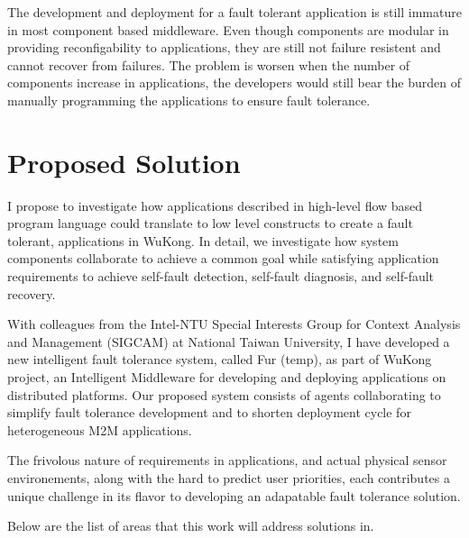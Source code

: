 The development and deployment for a fault tolerant application is still
immature in most component based middleware. Even though components are modular
in providing reconfigability to applications, they are still not failure resistent
and cannot recover from failures. The problem is worsen when the number of
components increase in applications, the developers would still bear the burden
of manually programming the applications to ensure fault tolerance.

\section{Proposed Solution}

I propose to investigate how applications described in high-level flow based 
program language could translate to low level constructs to create a
fault tolerant, applications in WuKong. In detail, we investigate how
system components collaborate to achieve a common goal while satisfying
application requirements to achieve self-fault detection, self-fault diagnosis,
and self-fault recovery. 

With colleagues from the Intel-NTU Special Interests Group for Context Analysis 
and Management (SIGCAM) at National Taiwan University, I have developed a 
new intelligent fault tolerance system, called Fur (temp), as part of WuKong
project, an Intelligent Middleware for developing and deploying 
applications on distributed platforms. Our proposed system consists of agents
collaborating to simplify fault
tolerance development and to shorten deployment cycle for heterogeneous M2M
applications.

The frivolous nature of requirements in applications, and actual physical sensor 
environements, along with the hard to predict user priorities, each contributes
a unique challenge in its flavor to developing an adapatable fault tolerance 
solution.

Below are the list of areas that this work will address solutions in.

